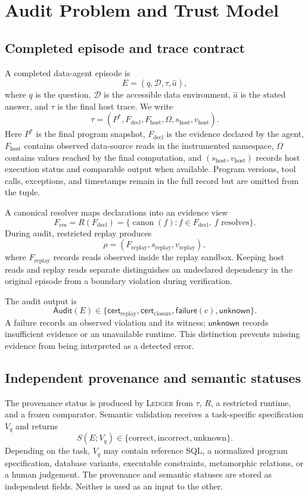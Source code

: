 \documentclass[5p,times]{elsarticle}
\newcommand{\ledger}{\textsc{Ledger}\xspace}
\newcommand{\operands}{\Omega}
\newcommand{\cert}{\mathsf{cert}}
\newcommand{\unknown}{\mathsf{unknown}}
\newcommand{\failure}{\mathsf{failure}}
\begin{document}
\section{Audit Problem and Trust Model}\label{sec:problem}

\subsection{Completed episode and trace contract}

A completed data-agent episode is
\[
E=(q,\mathcal D,\tau,\hat a),
\]
where $q$ is the question, $\mathcal D$ is the accessible data environment, $\hat a$ is the stated answer, and $\tau$ is the final host trace. We write
\[
\tau=(P^*,F_{\mathrm{decl}},F_{\mathrm{host}},\operands,
      s_{\mathrm{host}},v_{\mathrm{host}}).
\]
Here $P^*$ is the final program snapshot, $F_{\mathrm{decl}}$ is the evidence declared by the agent, $F_{\mathrm{host}}$ contains observed data-source reads in the instrumented namespace, $\operands$ contains values reached by the final computation, and $(s_{\mathrm{host}},v_{\mathrm{host}})$ records host execution status and comparable output when available. Program versions, tool calls, exceptions, and timestamps remain in the full record but are omitted from the tuple.

A canonical resolver maps declarations into an evidence view
\[
F_{\mathrm{res}}=R(F_{\mathrm{decl}})
 =\{\operatorname{canon}(f):f\in F_{\mathrm{decl}},\ f\text{ resolves}\}.
\]
During audit, restricted replay produces
\[
\rho=(F_{\mathrm{replay}},s_{\mathrm{replay}},v_{\mathrm{replay}}),
\]
where $F_{\mathrm{replay}}$ records reads observed inside the replay sandbox. Keeping host reads and replay reads separate distinguishes an undeclared dependency in the original episode from a boundary violation during verification.

The audit output is
\[
\mathsf{Audit}(E)\in
\{\cert_{\mathrm{replay}},\cert_{\mathrm{closure}},
  \failure(c),\unknown\}.
\]
A failure records an observed violation and its witness; $\unknown$ records insufficient evidence or an unavailable runtime. This distinction prevents missing evidence from being interpreted as a detected error.

\subsection{Independent provenance and semantic statuses}\label{sec:statuses}

The provenance status is produced by \ledger from $\tau$, $R$, a restricted runtime, and a frozen comparator. Semantic validation receives a task-specific specification $V_q$ and returns
\[
S(E;V_q)\in\{\mathrm{correct},\mathrm{incorrect},\mathrm{unknown}\}.
\]
Depending on the task, $V_q$ may contain reference SQL, a normalized program specification, database variants, executable constraints, metamorphic relations, or a human judgement. The provenance and semantic statuses are stored as independent fields. Neither is used as an input to the other.
\end{document}
